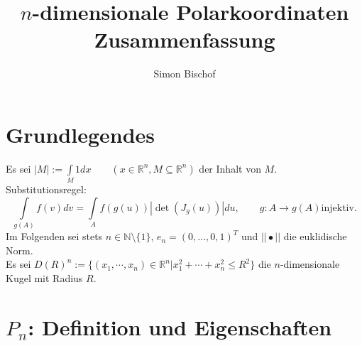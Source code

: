 \documentclass[a4paper,11pt]{scrartcl}
\newcommand{\R}{{\ensuremath{\mathbb{R}}}}
\newcommand{\N}{{\ensuremath{\mathbb{N}}}}
\begin{document}
\pagestyle{empty}
\author{\large Simon Bischof}
\title{{\LARGE $n$-dimensionale Polarkoordinaten} \\ {\large Zusammenfassung}}
\date{}
\maketitle
{}
\section{Grundlegendes}
Es sei $|M|:=\int\limits_M 1dx \qquad (x\in\R^n,M\subseteq \R^n)$ der Inhalt von $M$.\\
Substitutionsregel:
\begin{equation*}
\label{subst}
\int\limits_{g(A)}f(v)dv=\int\limits_A f(g(u))|\det(J_g(u))| du, \qquad g:A\to g(A) \text{injektiv.}
\end{equation*}
Im Folgenden sei stets $n\in\N\setminus\{1\}$, $e_n=(0,\ldots,0,1)^T$ und $||\bullet||$ die euklidische Norm.\\
Es sei $D(R)^n:=\{(x_1,\cdots,x_n)\in\R^n|x_1^2+\cdots+x_n^2\leq R^2\}$ die $n$-dimensionale Kugel mit Radius $R$.
\section{$P_n$: Definition und Eigenschaften}
\end{document}

